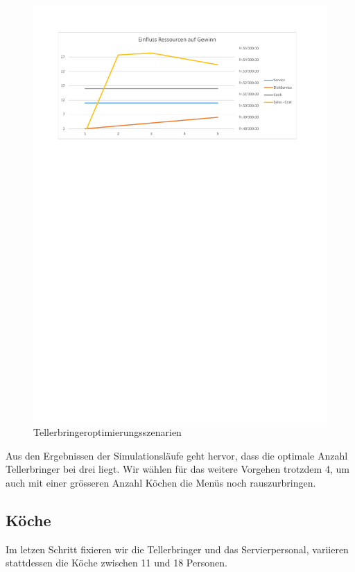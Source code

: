 \documentclass[ngerman,a4paper,12pt]{scrreprt}
\begin{document}
				\begin{figure}[H]
					\centering
						\includegraphics[trim=2cm 22.75cm 2.5cm 2cm, clip=true,width=\textwidth]{../Auswertung/3_DishService.pdf}
						\caption[Tellerbringeroptimierungsszenarien]{Tellerbringeroptimierungsszenarien}
						\label{Tellerbringeroptimierungsszenarien}
				\end{figure}				
				
				Aus den Ergebnissen der Simulationsläufe geht hervor, dass die optimale Anzahl Tellerbringer bei drei liegt. Wir wählen für das weitere Vorgehen trotzdem 4, um auch mit einer grösseren Anzahl Köchen die Menüs noch rauszurbringen.

			\subsection{Köche}
				Im letzen Schritt fixieren wir die Tellerbringer und das Servierpersonal, variieren stattdessen die Köche zwischen 11 und 18 Personen.
				
\end{document}

